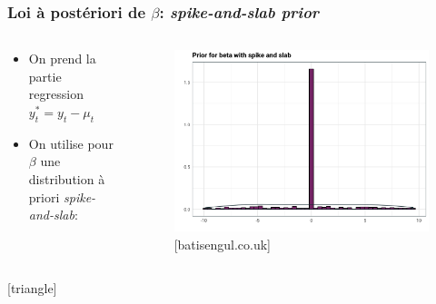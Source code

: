 \begin{frame}
    \frametitle{Loi à postériori de $\beta$: \textit{spike-and-slab prior}}
    \vspace{-1cm}
    \begin{columns}
        \begin{column}{0.8\textwidth}
            \vspace{-1cm}
            \begin{itemize}
                \item On prend la partie regression $y_{t}^{*}=y_{t}-\mu_{t}$
                \item On utilise pour $\beta$ une distribution à priori \textit{spike-and-slab}:
            \end{itemize}
            
        \end{column}
        \begin{column}{0.2\textwidth}

            \begin{figure}
                \includegraphics[width=\textwidth]{Figures/pike.png}
                \caption{[batisengul.co.uk]}
            \end{figure}
        
        \end{column}
\end{columns}
\vspace{-1.5cm}
       [triangle]
     
           
    

\end{frame}
